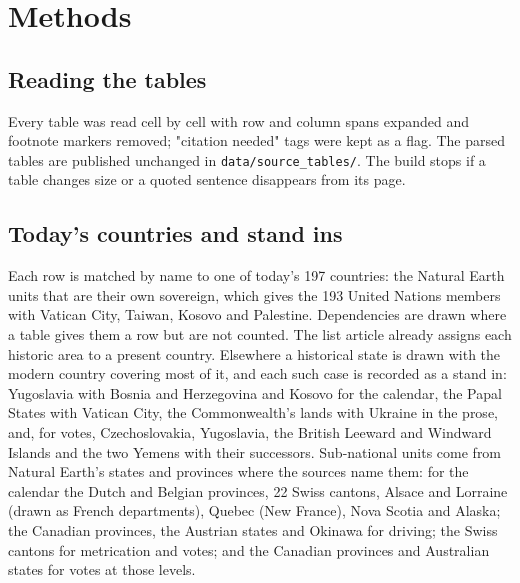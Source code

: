 \documentclass[11pt,a4paper]{article}
\begin{document}
\section{Methods}
\subsection{Reading the tables}
Every table was read cell by cell with row and column spans expanded and footnote markers removed; "citation needed" tags were kept as a flag. The parsed tables are published unchanged in \texttt{data/source\_tables/}. The build stops if a table changes size or a quoted sentence disappears from its page.

\subsection{Today's countries and stand ins}
Each row is matched by name to one of today's 197 countries: the Natural Earth units that are their own sovereign, which gives the 193 United Nations members with Vatican City, Taiwan, Kosovo and Palestine. Dependencies are drawn where a table gives them a row but are not counted. The list article already assigns each historic area to a present country. Elsewhere a historical state is drawn with the modern country covering most of it, and each such case is recorded as a stand in: Yugoslavia with Bosnia and Herzegovina and Kosovo for the calendar, the Papal States with Vatican City, the Commonwealth's lands with Ukraine in the prose, and, for votes, Czechoslovakia, Yugoslavia, the British Leeward and Windward Islands and the two Yemens with their successors. Sub-national units come from Natural Earth's states and provinces where the sources name them: for the calendar the Dutch and Belgian provinces, 22 Swiss cantons, Alsace and Lorraine (drawn as French departments), Quebec (New France), Nova Scotia and Alaska; the Canadian provinces, the Austrian states and Okinawa for driving; the Swiss cantons for metrication and votes; and the Canadian provinces and Australian states for votes at those levels.
\end{document}
